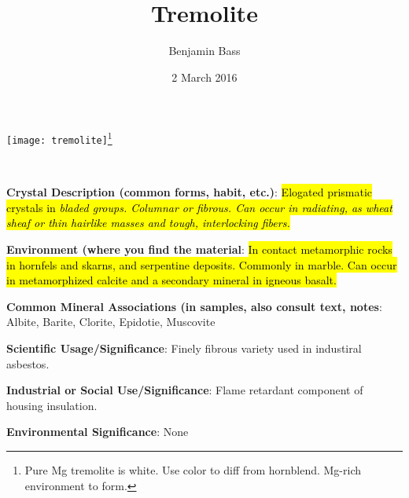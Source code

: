 \documentclass[10pt]{article}
\author{Benjamin Bass}
\date{2 March 2016}
\title{\vspace{-2.0cm} Tremolite} %
\begin{document}
\maketitle


\begin{center}
  \texttt{[image: tremolite]}\footnote{Pure Mg tremolite is white. Use color to diff from hornblend. Mg-rich environment to form. }
\end{center}



\
\
\
\
\
\
\
\
\
\

\begin{framed}
  \textbf{Crystal Description (common forms, habit, etc.)}: \hl{Elogated prismatic crystals in \it{bladed} groups. Columnar or fibrous. Can occur in radiating, as wheat sheaf or thin hairlike masses and tough, interlocking fibers.}
\end{framed}

\begin{framed}
  \textbf{Environment (where you find the material}: \hl{In contact metamorphic rocks in hornfels and skarns, and serpentine deposits. Commonly in marble. Can occur in metamorphized calcite and a secondary mineral in igneous basalt.}
\end{framed}

\begin{framed}
  \textbf{Common Mineral Associations (in samples, also consult text, notes}: Albite, Barite, Clorite, Epidotie, Muscovite
\end{framed}

\begin{framed}
  \textbf{Scientific Usage/Significance}: Finely fibrous variety used in industiral asbestos.
\end{framed}

\begin{framed}
  \textbf{Industrial or Social Use/Significance}: Flame retardant component of housing insulation.
\end{framed}

\begin{framed}
  \textbf{Environmental Significance}: None
\end{framed}

\end{document}
